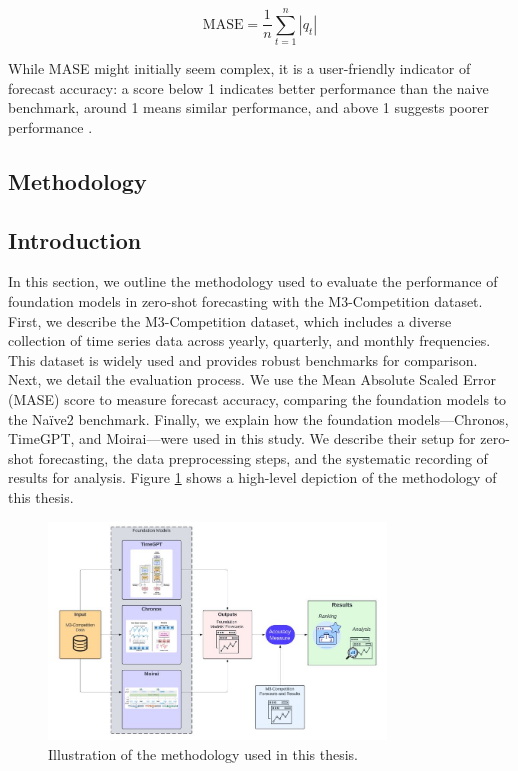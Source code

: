 \documentclass[12pt,a4paper]{article}
\begin{document}
\begin{equation}
  \text{MASE} = \frac{1}{n} \sum_{t=1}^{n} \left| q_t \right|
\end{equation}

While MASE might initially seem complex, it is a user-friendly indicator of forecast accuracy: a score below 1 indicates better performance than the naive benchmark, around 1 means similar performance, and above 1 suggests poorer performance \parencite[684--685]{HyndmanAccuracy2006}.


\begin{center}
  \section{Methodology}
\end{center}

\subsection{Introduction}

In this section, we outline the methodology used to evaluate the performance of foundation models in zero-shot forecasting with the M3-Competition dataset. First, we describe the M3-Competition dataset, which includes a diverse collection of time series data across yearly, quarterly, and monthly frequencies. This dataset is widely used and provides robust benchmarks for comparison. Next, we detail the evaluation process. We use the Mean Absolute Scaled Error (MASE) score to measure forecast accuracy, comparing the foundation models to the Naïve2 benchmark. Finally, we explain how the foundation models—Chronos, TimeGPT, and Moirai—were used in this study. We describe their setup for zero-shot forecasting, the data preprocessing steps, and the systematic recording of results for analysis. Figure \ref{methodology} shows a high-level depiction of the methodology of this thesis. 


\begin{figure}[htbp]
  \centering
  \includegraphics[width=0.8\textwidth]{method_fig.png}
  \caption{Illustration of the methodology used in this thesis.}
  \label{methodology}
\end{figure}
\end{document}
